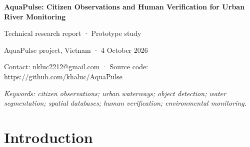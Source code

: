 \documentclass[a4paper,11pt]{article}
\begin{document}
\begin{center}
{\LARGE\bfseries AquaPulse: Citizen Observations and Human Verification for Urban River Monitoring\par}
\vspace{0.5em}
{\small Technical research report · Prototype study\par}
{\small AquaPulse project, Vietnam · 4 October 2026\par}
{\small Contact: \href{mailto:nkluc2212@gmail.com}{nkluc2212@gmail.com} · Source code: \url{https://github.com/khaluc/AquaPulse}\par}
\end{center}
\vspace{0.2em}
\begin{abstract}

Urban river observations often remain isolated photographs rather than records that can be checked and followed through to action. AquaPulse addresses this problem with a bilingual web application that connects citizen reports, image analysis, spatial records, human verification, and community activities. The prototype combines fine-tuned YOLO11 container detection and water segmentation with external Kimi scene descriptions and structured reporter answers. Evidence is processed according to the scope of each model; confidence is displayed separately from environmental indicators, and serious or uncertain cases require human review. Detection experiments use a cleaned, scene-grouped preparation of VisText-Mosquito. At a validation-selected confidence threshold of 0.35, the clean YOLO11n detector achieves 75.43\% precision, 82.59\% box recall, and 78.85\% F1 on 167 held-out images containing 316 annotated objects. Its test mAP50 is 0.7834 and mAP50–95 is 0.5057. These results support a bounded container-detection task, while segmentation validation results and application demonstrations provide more limited evidence. The report describes the training, evaluation, API integration, deployment, and remaining need for independent local and field validation.

\end{abstract}
\noindent\textit{Keywords: citizen observations; urban waterways; object detection; water segmentation; spatial databases; human verification; environmental monitoring.}

\section{Introduction}
\end{document}
